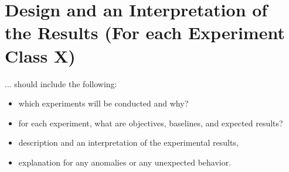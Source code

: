 \section{Design and an Interpretation of the Results (For each Experiment Class X)}
... should include the following:
\begin{itemize}
\item which experiments will be conducted and why?
\item for each experiment, what are objectives, baselines, and expected results?
\item description and an interpretation of the experimental results,
\item explanation for any anomalies or any unexpected behavior.
\end{itemize}
\endgroup
\begin{comment} 
\section{For each Experiment Class X}

\subsection{Experimental Design}
This sub-section should answer the questions -
\begin{itemize}
\item which experiments will be conducted and why?
\item for each experiment, what are objectives, baselines, and expected results?
\end{itemize}


\subsection{Interpretation of the Results}
This sub-section should include
\begin{itemize}
\item 	description and an interpretation of the experimental results.
\item 	explanation for any anomalies or any unexpected behavior.
\end{itemize}
\end{comment} 

